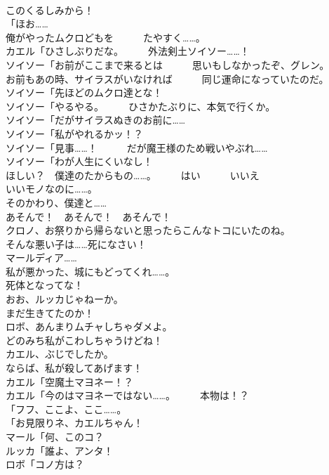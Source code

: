 \documentclass[8pt]{extreport}
\begin{document}
\begin{CJK}{UTF8}{min}
\\	このくるしみから！	
\\	「ほお……	
\\	俺がやったムクロどもを　　　たやすく……。	
\\	カエル「ひさしぶりだな。　　　外法剣土ソイソー……！	
\\	ソイソー「お前がここまで来るとは　　　思いもしなかったぞ、グレン。	
\\	お前もあの時、サイラスがいなければ　　　同じ運命になっていたのだ。	
\\	ソイソー「先ほどのムクロ達とな！	
\\	ソイソー「やるやる。　　　ひさかたぶりに、本気で行くか。	
\\	ソイソー「だがサイラスぬきのお前に……	
\\	ソイソー「私がやれるかッ！？	
\\	ソイソー「見事……！　　　だが魔王様のため戦いやぶれ……	
\\	ソイソー「わが人生にくいなし！	
\\	ほしい？　僕達のたからもの……。　　　はい　　　いいえ	
\\	いいモノなのに……。	
\\	そのかわり、僕達と……	
\\	あそんで！　あそんで！　あそんで！	
\\	クロノ、お祭りから帰らないと思ったらこんなトコにいたのね。	
\\	そんな悪い子は……死になさい！	
\\	マールディア……	
\\	私が悪かった、城にもどってくれ……。	
\\	死体となってな！	
\\	おお、ルッカじゃねーか。	
\\	まだ生きてたのか！	
\\	ロボ、あんまりムチャしちゃダメよ。	
\\	どのみち私がこわしちゃうけどね！	
\\	カエル、ぶじでしたか。	
\\	ならば、私が殺してあげます！	
\\	カエル「空魔土マヨネー！？	
\\	カエル「今のはマヨネーではない……。　　　本物は！？	
\\	「フフ、ここよ、ここ……。	
\\	「お見限りネ、カエルちゃん！	
\\	マール「何、このコ？	
\\	ルッカ「誰よ、アンタ！	
\\	ロボ「コノ方は？	

\end{CJK}
\end{document}
